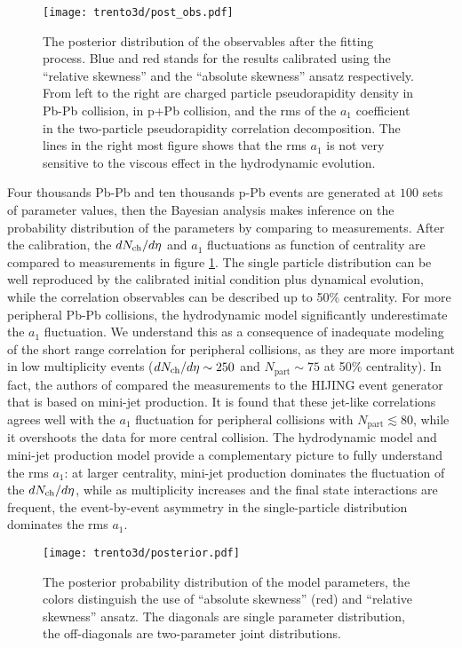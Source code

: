 \begin{figure}
\singlespacing 
\texttt{[image: trento3d/post\_obs.pdf]}
\caption[The posterior distribution of the observables after the fitting]{The posterior distribution of the observables after the fitting process. Blue and red stands for the results calibrated using the ``relative skewness'' and the ``absolute skewness'' ansatz respectively.
From left to the right are charged particle pseudorapidity density in Pb-Pb collision, in p+Pb collision, and the rms of the $a_1$ coefficient in the two-particle pseudorapidity correlation decomposition. The lines in the right most figure shows that the rms $a_1$ is not very sensitive to the viscous effect in the hydrodynamic evolution.}
\label{fig:trento:post_obs}
\end{figure}

Four thousands Pb-Pb and ten thousands p-Pb events are generated at $100$ sets of parameter values, then the Bayesian analysis makes inference on the probability distribution of the parameters by comparing to measurements.
After the calibration, the $dN_\text{ch}/d\eta$ and $a_1$ fluctuations as function of centrality are compared to measurements in figure \ref{fig:trento:post_obs}.
The single particle distribution can be well reproduced by the calibrated initial condition plus dynamical evolution, while the correlation observables can be described up to 50\% centrality. 
For more peripheral Pb-Pb collisions, the hydrodynamic model significantly underestimate the $a_1$ fluctuation.
We understand this as a consequence of inadequate modeling of the short range correlation for peripheral collisions, as they are more important in low multiplicity events ($dN_\text{ch}/d\eta\sim 250$ and $N_{\textrm{part}} \sim 75$ at 50\% centrality).
In fact, the authors of \cite{ATLAS:2015kla} compared the measurements to the HIJING event generator that is based on mini-jet production.
It is found that these jet-like correlations agrees well with the $a_1$ fluctuation for peripheral collisions with $N_{\textrm{part}} \lesssim 80$, while it overshoots the data for more central collision.
The hydrodynamic model and mini-jet production model provide a complementary picture to fully understand the rms $a_1$: at larger centrality, mini-jet production dominates the fluctuation of the $dN_\text{ch}/d\eta$, while as multiplicity increases and the final state interactions are frequent, the event-by-event asymmetry in the single-particle distribution dominates the rms $a_1$.

\begin{figure}
\singlespacing 
\centering
\texttt{[image: trento3d/posterior.pdf]}
\caption[The posterior probability distribution of the model parameters,]{The posterior probability distribution of the model parameters, the colors distinguish the use of ``absolute skewness'' (red) and ``relative skewness'' ansatz. The diagonals are single parameter distribution, the off-diagonals are two-parameter joint distributions.}
\label{fig:trento:posterior}
\end{figure}

